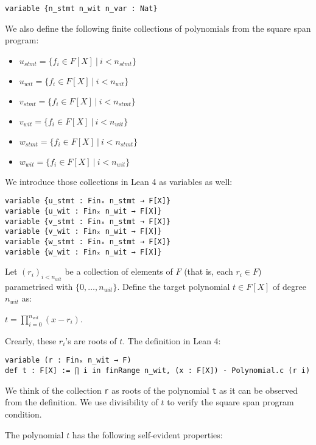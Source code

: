 \documentclass{article}
\theoremstyle{definition}
\theoremstyle{remark}
\begin{document}
\begin{lstlisting}
variable {n_stmt n_wit n_var : Nat}
\end{lstlisting}

We also define the following finite collections of polynomials from the square span program:

\begin{itemize}
\item $u_{stmt} = \{ f_{i} \in F[X] \: | \: i < n_{stmt} \}$
\item $u_{wit} = \{ f_{i} \in F[X] \: | \: i < n_{wit} \}$
\item $v_{stmt} = \{ f_{i} \in F[X] \: | \: i < n_{stmt} \}$
\item $v_{wit} = \{ f_{i} \in F[X] \: | \: i < n_{wit} \}$
\item $w_{stmt} = \{ f_{i} \in F[X] \: | \: i < n_{stmt} \}$
\item $w_{wit} = \{ f_{i} \in F[X] \: | \: i < n_{wit} \}$
\end{itemize}

We introduce those collections in Lean 4 as variables as well:

\begin{lstlisting}
variable {u_stmt : Finₓ n_stmt → F[X]}
variable {u_wit : Finₓ n_wit → F[X]}
variable {v_stmt : Finₓ n_stmt → F[X]}
variable {v_wit : Finₓ n_wit → F[X]}
variable {w_stmt : Finₓ n_stmt → F[X]}
variable {w_wit : Finₓ n_wit → F[X]}
\end{lstlisting}

Let $(r_i)_{i < n_{wit}}$ be a collection of elements of $F$ (that is, each $r_i \in F$) parametrised with $\{0, \dots, n_{wit} \}$.
Define the target polynomial $t \in F[X]$ of degree $n_{wit}$ as:
\begin{center}
$t = \prod \limits_{i = 0}^{n_{wit}} (x - r_i)$.
\end{center}

Crearly, these $r_i$'s are roots of $t$. The definition in Lean 4:
\begin{lstlisting}
variable (r : Finₓ n_wit → F)
def t : F[X] := ∏ i in finRange n_wit, (x : F[X]) - Polynomial.c (r i)
\end{lstlisting}

We think of the collection \verb"r" as roots of the polynomial \verb"t" as it can be observed from the definition.
We use divisibility of $t$ to verify the square span program condition.

The polynomial $t$ has the following self-evident properties:
\end{document}
